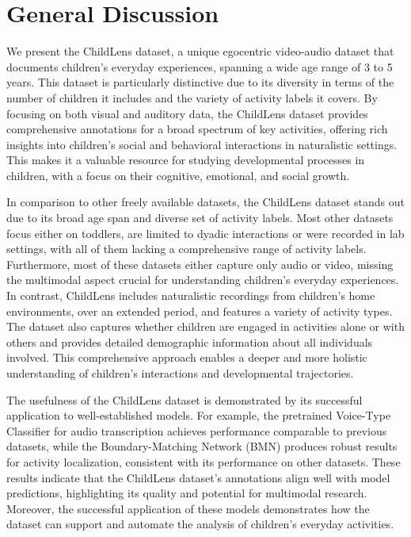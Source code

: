 \documentclass[
  man,floatsintext]{apa6}
\begin{document}
\section{General Discussion}\label{general-discussion}

We present the ChildLens dataset, a unique egocentric video-audio dataset that documents children's everyday experiences, spanning a wide age range of 3 to 5 years. This dataset is particularly distinctive due to its diversity in terms of the number of children it includes and the variety of activity labels it covers. By focusing on both visual and auditory data, the ChildLens dataset provides comprehensive annotations for a broad spectrum of key activities, offering rich insights into children's social and behavioral interactions in naturalistic settings. This makes it a valuable resource for studying developmental processes in children, with a focus on their cognitive, emotional, and social growth.

In comparison to other freely available datasets, the ChildLens dataset stands out due to its broad age span and diverse set of activity labels. Most other datasets focus either on toddlers, are limited to dyadic interactions or were recorded in lab settings, with all of them lacking a comprehensive range of activity labels. Furthermore, most of these datasets either capture only audio or video, missing the multimodal aspect crucial for understanding children's everyday experiences. In contrast, ChildLens includes naturalistic recordings from children's home environments, over an extended period, and features a variety of activity types. The dataset also captures whether children are engaged in activities alone or with others and provides detailed demographic information about all individuals involved. This comprehensive approach enables a deeper and more holistic understanding of children's interactions and developmental trajectories.

The usefulness of the ChildLens dataset is demonstrated by its successful application to well-established models. For example, the pretrained Voice-Type Classifier for audio transcription achieves performance comparable to previous datasets, while the Boundary-Matching Network (BMN) produces robust results for activity localization, consistent with its performance on other datasets. These results indicate that the ChildLens dataset's annotations align well with model predictions, highlighting its quality and potential for multimodal research. Moreover, the successful application of these models demonstrates how the dataset can support and automate the analysis of children's everyday activities.
\end{document}
